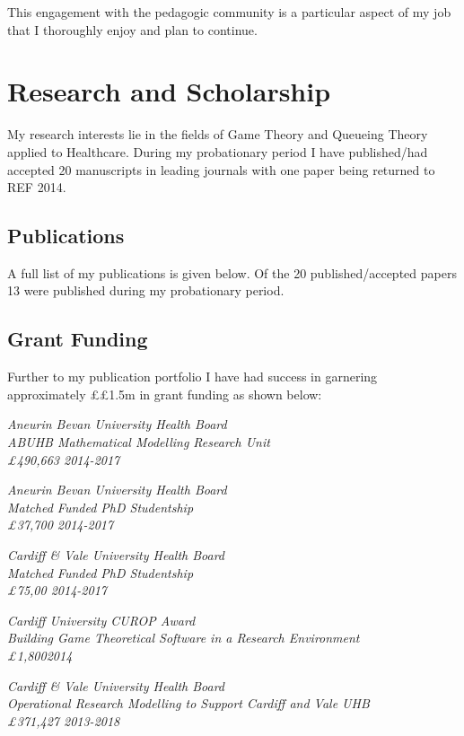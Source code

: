 \documentclass{article}
\begin{document}
This engagement with the pedagogic community is a particular aspect of my job that I thoroughly enjoy and plan to continue.

\section{Research and Scholarship}\label{sec:research}

My research interests lie in the fields of Game Theory and Queueing Theory applied to Healthcare.
During my probationary period I have published/had accepted 20 manuscripts in leading journals with one paper being returned to REF 2014.

\subsection{Publications}

A full list of my publications is given below. Of the 20 published/accepted papers 13 were published during my probationary period.



\subsection{Grant Funding}

Further to my publication portfolio I have had success in garnering approximately \pounds£1.5m in grant funding as shown below:

\sl{Aneurin Bevan University Health Board}\\
ABUHB Mathematical Modelling Research Unit\\
\pounds490,663 \hfill{2014-2017}


\sl{Aneurin Bevan University Health Board}\\
Matched Funded PhD Studentship\\
\pounds37,700 \hfill{2014-2017}

\sl{Cardiff \& Vale University Health Board}\\
Matched Funded PhD Studentship\\
\pounds75,00 \hfill{2014-2017}


\sl{Cardiff University CUROP Award}\\
Building Game Theoretical Software in a Research Environment\\
\pounds1,800\hfill{2014}


\sl{Cardiff \& Vale University Health Board}\\
Operational Research Modelling to Support Cardiff and Vale UHB\\
\pounds 371,427 \hfill{2013-2018}
\end{document}
